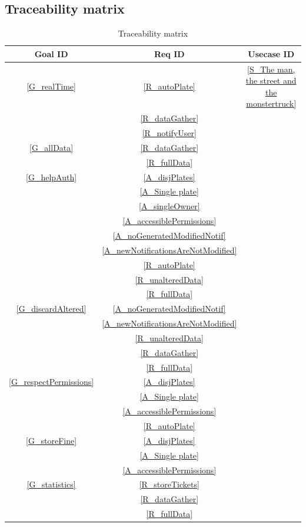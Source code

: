 \documentclass{article}
\begin{document}
	\subsection{Traceability matrix}
		\begin{table}[H]
			\begin{center}
				\caption{Traceability matrix}
				\label{Trace matrix}
				\begin{tabular}{c|c|c}
					\textbf{Goal ID} & \textbf{Req ID} & \textbf{Usecase ID}\\
					\hline
					\ref{G_realTime} 	& \ref{R_autoPlate}	& \ref{S_The man, the street and the monstertruck}\\
										&\ref{R_dataGather}	&\\
										&\ref{R_notifyUser}	&\\
					\hline
					\ref{G_allData} 	& \ref{R_dataGather} & \\
									& \ref{R_fullData} & \\
					\hline
					\ref{G_helpAuth}	&\ref{A_disjPlates}&\\
									&\ref{A_Single plate}&\\
									&\ref{A_singleOwner}&\\
									&\ref{A_accessiblePermissions}&\\
									&\ref{A_noGeneratedModifiedNotif}&\\
									&\ref{A_newNotificationsAreNotModified}&\\
									&\ref{R_autoPlate}&\\
									&\ref{R_unalteredData}&\\
									&\ref{R_fullData}&\\
					\hline
					\ref{G_discardAltered}	&\ref{A_noGeneratedModifiedNotif}&\\
											&\ref{A_newNotificationsAreNotModified}&\\
											&\ref{R_unalteredData}&\\
											&\ref{R_dataGather}&\\
											&\ref{R_fullData}&\\
											
					\hline
					\ref{G_respectPermissions}	&\ref{A_disjPlates}&\\
												&\ref{A_Single plate}&\\
												&\ref{A_accessiblePermissions}&\\
												&\ref{R_autoPlate}&\\
					\hline
					\ref{G_storeFine}	&\ref{A_disjPlates}&\\
										&\ref{A_Single plate}&\\
										&\ref{A_accessiblePermissions}&\\
					\hline
					\ref{G_statistics}	&\ref{R_storeTickets}\\
										&\ref{R_dataGather}&\\
										&\ref{R_fullData}&\\
										
				\end{tabular}
			\end{center}
		\end{table}
		
\end{document}
